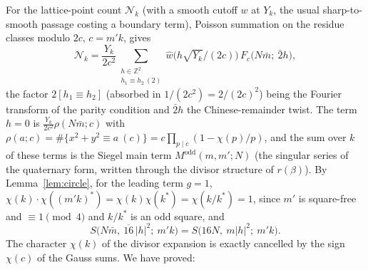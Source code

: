 \documentclass[11pt,a4paper]{article}
\theoremstyle{remark}
\theoremstyle{definition}
\newcommand{\Z}{\mathbb Z}
\begin{document}
For the lattice-point count $\mathcal N_k$ (with a smooth cutoff $w$ at $Y_k$, the usual sharp-to-smooth passage costing a boundary term), Poisson summation on the residue classes modulo $2c$, $c=m'k$, gives
\begin{equation}\label{eq:poisson}
\mathcal N_k=\frac{Y_k}{2c^2}\sum_{\substack{h\in\Z^2\\ h_1\equiv h_2\ (2)}}\hat w\bigl(h\sqrt{Y_k}/(2c)\bigr)\,F_c\bigl(N\bar m;\ \bar2h\bigr),
\end{equation}
the factor $2[h_1\equiv h_2]$ (absorbed in $1/(2c^2)=2/(2c)^2$) being the Fourier transform of the parity condition and $\bar2h$ the Chinese-remainder twist. The term $h=0$ is $\frac{Y_k}{2c^2}\rho(N\bar m;c)$ with $\rho(a;c)=\#\{x^2+y^2\equiv a\ (c)\}=c\prod_{p\mid c}(1-\chi(p)/p)$, and the sum over $k$ of these terms is the Siegel main term $M^{\mathrm{odd}}(m,m';N)$ (the singular series of the quaternary form, written through the divisor structure of $r(\beta)$). By Lemma~\ref{lem:circle}, for the leading term $g=1$, $\chi(k)\cdot\chi((m'k)^{*})=\chi(k)\chi(k^{*})=\chi(k/k^{*})=1$, since $m'$ is square-free and $\equiv1\pmod4$ and $k/k^{*}$ is an odd square, and
\[
S\bigl(N\bar m,\ \overline{16}\,|h|^2;\ m'k\bigr)=S\bigl(16N,\ m|h|^2;\ m'k\bigr).
\]
The character $\chi(k)$ of the divisor expansion is exactly cancelled by the sign $\chi(c)$ of the Gauss sums. We have proved:
\end{document}

